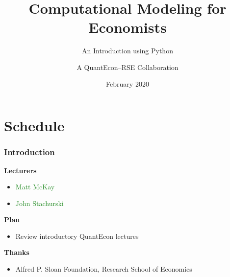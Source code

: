 \documentclass[
    xcolor={svgnames},
    hyperref={colorlinks, citecolor=DeepPink4, linkcolor=DarkRed, urlcolor=DarkBlue}
    ]{beamer}  %
\title{Computational Modeling for Economists}
\subtitle{An Introduction using Python}
\author{A QuantEcon--RSE Collaboration}
\date{February 2020}
\newcommand{\green}[1]{\textcolor{ForestGreen}{\sf #1}}
\newcommand{\1}{\mathbbm 1}
\begin{document}
\begin{frame}
  \titlepage
\end{frame}





\section{Schedule}



\begin{frame}
    \frametitle{Introduction}


    \textbf{Lecturers}

    \begin{itemize}
        \item \green{Matt McKay}
            \vspace{0.5em}
        \item \green{John Stachurski}
            \vspace{0.5em}
    \end{itemize}

            \vspace{0.5em}
            \vspace{0.5em}

    \textbf{Plan}

    \begin{itemize}
        \item Review introductory QuantEcon lectures 
    \end{itemize}



            \vspace{0.5em}
            \vspace{0.5em}

    \textbf{Thanks}


    \begin{itemize}
        \item Alfred P. Sloan Foundation, Research School of Economics
    \end{itemize}

\end{frame}
\end{document}
